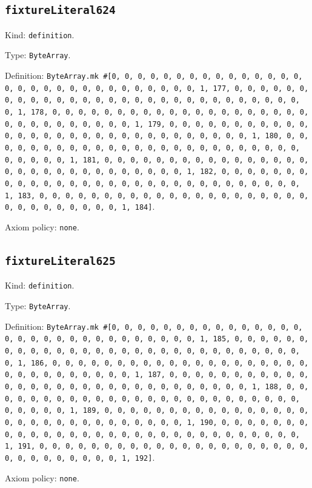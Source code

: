 \documentclass[11pt]{article}
\begin{document}
\subsection*{\texttt{fixtureLiteral624}}
\noindent Kind: \texttt{definition}.\par
\noindent Type: \texttt{ByteArray}.\par
\noindent Definition: \texttt{ByteArray.mk \#[0, 0, 0, 0, 0, 0, 0, 0, 0, 0, 0, 0, 0, 0, 0, 0, 0, 0, 0, 0, 0, 0, 0, 0, 0, 0, 0, 0, 0, 0, 1, 177, 0, 0, 0, 0, 0, 0, 0, 0, 0, 0, 0, 0, 0, 0, 0, 0, 0, 0, 0, 0, 0, 0, 0, 0, 0, 0, 0, 0, 0, 0, 1, 178, 0, 0, 0, 0, 0, 0, 0, 0, 0, 0, 0, 0, 0, 0, 0, 0, 0, 0, 0, 0, 0, 0, 0, 0, 0, 0, 0, 0, 0, 0, 1, 179, 0, 0, 0, 0, 0, 0, 0, 0, 0, 0, 0, 0, 0, 0, 0, 0, 0, 0, 0, 0, 0, 0, 0, 0, 0, 0, 0, 0, 0, 0, 1, 180, 0, 0, 0, 0, 0, 0, 0, 0, 0, 0, 0, 0, 0, 0, 0, 0, 0, 0, 0, 0, 0, 0, 0, 0, 0, 0, 0, 0, 0, 0, 1, 181, 0, 0, 0, 0, 0, 0, 0, 0, 0, 0, 0, 0, 0, 0, 0, 0, 0, 0, 0, 0, 0, 0, 0, 0, 0, 0, 0, 0, 0, 0, 1, 182, 0, 0, 0, 0, 0, 0, 0, 0, 0, 0, 0, 0, 0, 0, 0, 0, 0, 0, 0, 0, 0, 0, 0, 0, 0, 0, 0, 0, 0, 0, 1, 183, 0, 0, 0, 0, 0, 0, 0, 0, 0, 0, 0, 0, 0, 0, 0, 0, 0, 0, 0, 0, 0, 0, 0, 0, 0, 0, 0, 0, 0, 0, 1, 184]}.\par
\noindent Axiom policy: \texttt{none}.\par
\subsection*{\texttt{fixtureLiteral625}}
\noindent Kind: \texttt{definition}.\par
\noindent Type: \texttt{ByteArray}.\par
\noindent Definition: \texttt{ByteArray.mk \#[0, 0, 0, 0, 0, 0, 0, 0, 0, 0, 0, 0, 0, 0, 0, 0, 0, 0, 0, 0, 0, 0, 0, 0, 0, 0, 0, 0, 0, 0, 1, 185, 0, 0, 0, 0, 0, 0, 0, 0, 0, 0, 0, 0, 0, 0, 0, 0, 0, 0, 0, 0, 0, 0, 0, 0, 0, 0, 0, 0, 0, 0, 1, 186, 0, 0, 0, 0, 0, 0, 0, 0, 0, 0, 0, 0, 0, 0, 0, 0, 0, 0, 0, 0, 0, 0, 0, 0, 0, 0, 0, 0, 0, 0, 1, 187, 0, 0, 0, 0, 0, 0, 0, 0, 0, 0, 0, 0, 0, 0, 0, 0, 0, 0, 0, 0, 0, 0, 0, 0, 0, 0, 0, 0, 0, 0, 1, 188, 0, 0, 0, 0, 0, 0, 0, 0, 0, 0, 0, 0, 0, 0, 0, 0, 0, 0, 0, 0, 0, 0, 0, 0, 0, 0, 0, 0, 0, 0, 1, 189, 0, 0, 0, 0, 0, 0, 0, 0, 0, 0, 0, 0, 0, 0, 0, 0, 0, 0, 0, 0, 0, 0, 0, 0, 0, 0, 0, 0, 0, 0, 1, 190, 0, 0, 0, 0, 0, 0, 0, 0, 0, 0, 0, 0, 0, 0, 0, 0, 0, 0, 0, 0, 0, 0, 0, 0, 0, 0, 0, 0, 0, 0, 1, 191, 0, 0, 0, 0, 0, 0, 0, 0, 0, 0, 0, 0, 0, 0, 0, 0, 0, 0, 0, 0, 0, 0, 0, 0, 0, 0, 0, 0, 0, 0, 1, 192]}.\par
\noindent Axiom policy: \texttt{none}.\par
\end{document}

